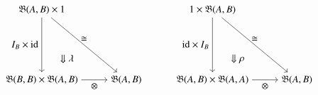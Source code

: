 \documentclass[12pt]{ociamthesis}
\newcommand{\id}{\mathrm{id}}
\begin{document}
\begin{equation*}
\begin{aligned}
\begin{tikzpicture}[yscale=2.5, xscale=3]
\node (A) at (0,1){$\fB(A,B) \times 1$};
\node (B) at (1,0) {$\fB(A,B)$};
\node (D) at (0,0) {$\fB(B,B) \times \fB(A,B)$};
\node (C) at (.3,.3){$\Downarrow \lambda$};
\draw[->] (A) to node[above]{$\iso$} (B);
\draw[->] (D) to node[below]{$\otimes$} (B);
\draw[->] (A) to node[left]{$  I_B \times \id$} (D);
\end{tikzpicture}
\hspace{1cm}
\begin{tikzpicture}[yscale=2.5, xscale=3]
\node (A) at (0,1){$1 \times \fB(A,B)$};
\node (B) at (1,0) {$\fB(A,B)$};
\node (D) at (0,0) {$\fB(A,B) \times \fB(A,A)$};
\node (C) at (.3,.3){$\Downarrow\rho$};
\draw[->] (A) to node[above]{$\iso$} (B);
\draw[->] (D) to node[below]{$\otimes$} (B);
\draw[->] (A) to node[left]{$\id \times I_B$} (D);
\end{tikzpicture}
\end{aligned}
\end{equation*}
\end{document}
